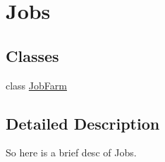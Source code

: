 \hypertarget{group__jobs}{\section{Jobs}
\label{group__jobs}
}
\subsection*{Classes}
\begin{DoxyCompactItemize}
\item 
class \hyperlink{classJobFarm}{Job\-Farm}
\end{DoxyCompactItemize}


\subsection{Detailed Description}
So here is a brief desc of Jobs. 